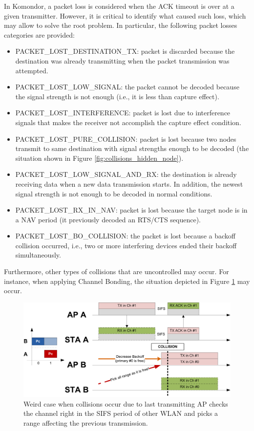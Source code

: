 \documentclass[a4paper]{article}
\begin{document}
	In Komondor, a packet loss is considered when the ACK timeout is over at a given transmitter. However, it is critical to identify what caused such loss, which may allow to solve the root problem. In particular, the following packet losses categories are provided:
	\begin{itemize}
		\item PACKET\_LOST\_DESTINATION\_TX: packet is discarded because the destination was already transmitting when the packet transmission was attempted.
		\item PACKET\_LOST\_LOW\_SIGNAL: the packet cannot be decoded because the signal strength is not enough (i.e., it is less than capture effect).
		\item PACKET\_LOST\_INTERFERENCE: packet is lost due to interference signals that makes the receiver not accomplish the capture effect condition.	
		\item PACKET\_LOST\_PURE\_COLLISION: packet is lost because two nodes transmit to same destination with signal strengths enough to be decoded	(the situation shown in Figure \ref{fig:collisions_hidden_node}).	
		\item PACKET\_LOST\_LOW\_SIGNAL\_AND\_RX: the destination is already receiving data when a new data transmission starts. In addition, the newest signal strength is not enough to be decoded in normal conditions.
		\item PACKET\_LOST\_RX\_IN\_NAV: packet is lost because the target node is in a NAV period (it previously decoded an RTS/CTS sequence).		
		\item PACKET\_LOST\_BO\_COLLISION: the packet is lost because a backoff collision occurred, i.e., two or more interfering devices ended their backoff simultaneously.
	\end{itemize}	
	
	Furthermore, other types of collisions that are uncontrolled may occur. For instance, when applying Channel Bonding, the situation depicted in Figure \ref{fig:boat1} may occur.
	\begin{figure}[h!]
		\centering
		\includegraphics[scale=0.7]{images/ACK_issue.png}
		\caption{Weird case when collisions occur due to last transmitting AP checks the channel right in the SIFS period of other WLAN and picks a range affecting the previous transmission.}
		\label{fig:boat1}
	\end{figure}
\end{document}
